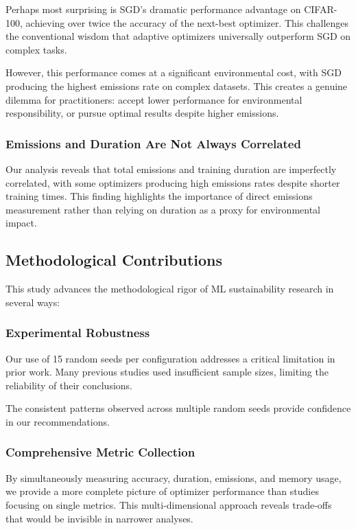 \documentclass[conference]{IEEEtran}
\begin{document}
Perhaps most surprising is SGD's dramatic performance advantage on CIFAR-100, achieving over twice the accuracy of the next-best optimizer. This challenges the conventional wisdom that adaptive optimizers universally outperform SGD on complex tasks.

However, this performance comes at a significant environmental cost, with SGD producing the highest emissions rate on complex datasets. This creates a genuine dilemma for practitioners: accept lower performance for environmental responsibility, or pursue optimal results despite higher emissions.

\subsubsection{Emissions and Duration Are Not Always Correlated}

Our analysis reveals that total emissions and training duration are imperfectly correlated, with some optimizers producing high emissions rates despite shorter training times. This finding highlights the importance of direct emissions measurement rather than relying on duration as a proxy for environmental impact.

\subsection{Methodological Contributions}

This study advances the methodological rigor of ML sustainability research in several ways:

\subsubsection{Experimental Robustness}

Our use of 15 random seeds per configuration addresses a critical limitation in prior work. Many previous studies used insufficient sample sizes, limiting the reliability of their conclusions.

The consistent patterns observed across multiple random seeds provide confidence in our recommendations.

\subsubsection{Comprehensive Metric Collection}

By simultaneously measuring accuracy, duration, emissions, and memory usage, we provide a more complete picture of optimizer performance than studies focusing on single metrics. This multi-dimensional approach reveals trade-offs that would be invisible in narrower analyses.
\end{document}
